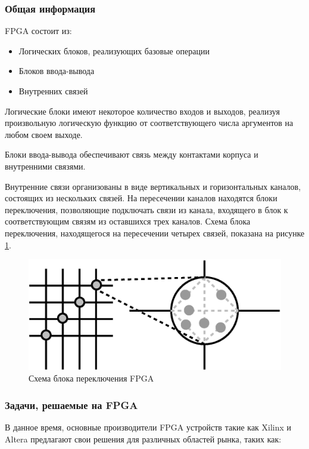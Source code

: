 \subsubsection{Общая информация}

FPGA состоит из:
\begin{itemize}
  \item Логических блоков, реализующих базовые операции
  \item Блоков ввода-вывода
  \item Внутренних связей
\end{itemize}

Логические блоки имеют некоторое количество входов и выходов, реализуя
произвольную логическую функцию от соответствующего числа аргументов на любом
своем выходе.

Блоки ввода-вывода обеспечивают связь между контактами корпуса и внутренними
связями.

Внутренние связи организованы в виде вертикальных и горизонтальных каналов,
состоящих из нескольких связей. На пересечении каналов находятся блоки
переключения, позволяющие подключать связи из канала, входящего в блок к
соответствующим связям из оставшихся трех каналов. Схема блока переключения,
находящегося на пересечении четырех связей, показана на рисунке \ref{fpga-cell}.

\begin{figure}
\includegraphics [width=\textwidth]{pictures/cell}
\caption{Схема блока переключения FPGA}
\label{fpga-cell}
\end{figure}

\subsubsection{Задачи, решаемые на FPGA}

В данное время, основные производители FPGA устройств такие как Xilinx и Altera
предлагают свои решения для различных областей рынка, таких как:

